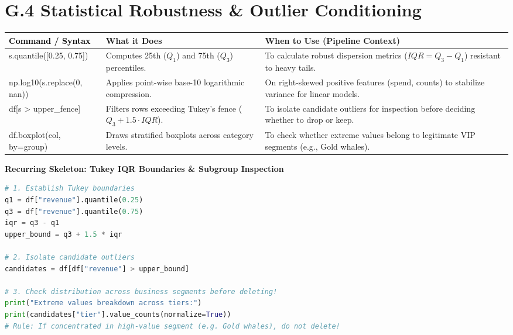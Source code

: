 \documentclass[11pt,a4paper]{article}
\begin{document}
{}
\section*{G.4 Statistical Robustness \& Outlier Conditioning}

{\small
\noindent
\begin{tabularx}{\textwidth}{|>{\raggedright\arraybackslash\ttfamily\footnotesize\color{codebase}}p{5.8cm}|>{\raggedright\arraybackslash}X|>{\raggedright\arraybackslash}X|}
\hline
\textbf{\textcolor{black}{\textrm{Command / Syntax}}} & \textbf{What it Does} & \textbf{When to Use (Pipeline Context)} \\ \hline
s.quantile([0.25, 0.75]) & Computes 25th ($Q_1$) and 75th ($Q_3$) percentiles. & To calculate robust dispersion metrics ($IQR = Q_3 - Q_1$) resistant to heavy tails. \\ \hline
np.log10(s.replace(0, nan)) & Applies point-wise base-10 logarithmic compression. & On right-skewed positive features (spend, counts) to stabilize variance for linear models. \\ \hline
df[s > upper\_fence] & Filters rows exceeding Tukey's fence ($Q_3 + 1.5 \cdot IQR$). & To isolate candidate outliers for inspection before deciding whether to drop or keep. \\ \hline
df.boxplot(col, by=group) & Draws stratified boxplots across category levels. & To check whether extreme values belong to legitimate VIP segments (e.g., Gold whales). \\ \hline
\end{tabularx}
}

\vspace{0.5em}
\noindent\textbf{Recurring Skeleton: Tukey IQR Boundaries \& Subgroup Inspection}\par\vspace{0.2em}\nopagebreak
\begin{lstlisting}[language=Python]
# 1. Establish Tukey boundaries
q1 = df["revenue"].quantile(0.25)
q3 = df["revenue"].quantile(0.75)
iqr = q3 - q1
upper_bound = q3 + 1.5 * iqr

# 2. Isolate candidate outliers
candidates = df[df["revenue"] > upper_bound]

# 3. Check distribution across business segments before deleting!
print("Extreme values breakdown across tiers:")
print(candidates["tier"].value_counts(normalize=True))
# Rule: If concentrated in high-value segment (e.g. Gold whales), do not delete!
\end{lstlisting}
\end{document}
